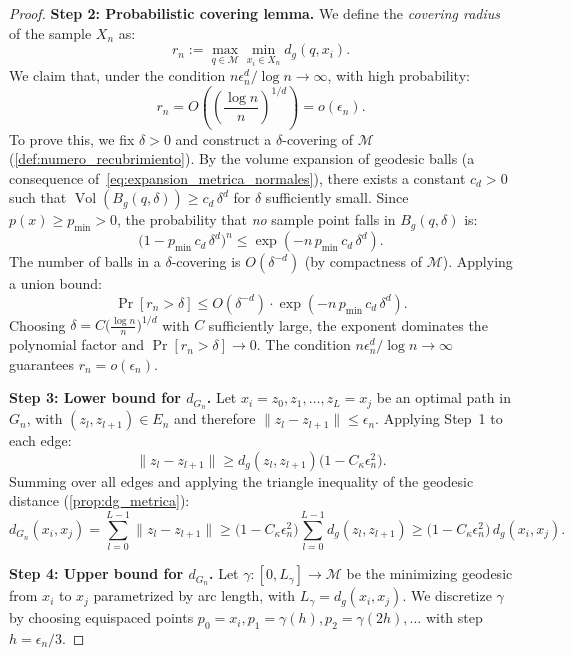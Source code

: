 \begin{proof}
	\textbf{Step 2: Probabilistic covering lemma.}
	We define the \emph{covering radius} of the sample $X_n$ as:
	\[
	r_n := \max_{q \in \mathcal{M}} \min_{x_i \in X_n} d_g(q, x_i).
	\]
	We claim that, under the condition $n\epsilon_n^d / \log n \to \infty$, with high probability:
	\begin{equation}\label{eq:radio_recubrimiento}
	r_n = O\!\left(\left(\frac{\log n}{n}\right)^{1/d}\right) = o(\epsilon_n).
	\end{equation}
	To prove this, we fix $\delta > 0$ and construct a $\delta$-covering of $\mathcal{M}$ (\autoref{def:numero_recubrimiento}). By the volume expansion of geodesic balls (a consequence of~\eqref{eq:expansion_metrica_normales}), there exists a constant $c_d > 0$ such that $\operatorname{Vol}(B_g(q, \delta)) \geq c_d \, \delta^d$ for $\delta$ sufficiently small. Since $p(x) \geq p_{\min} > 0$, the probability that \emph{no} sample point falls in $B_g(q, \delta)$ is:
	\[
	\bigl(1 - p_{\min} \, c_d \, \delta^d\bigr)^n \leq \exp(-n \, p_{\min} \, c_d \, \delta^d).
	\]
	The number of balls in a $\delta$-covering is $O(\delta^{-d})$ (by compactness of $\mathcal{M}$). Applying a union bound:
	\[
	\Pr[r_n > \delta] \leq O(\delta^{-d}) \cdot \exp(-n \, p_{\min} \, c_d \, \delta^d).
	\]
	Choosing $\delta = C\bigl(\frac{\log n}{n}\bigr)^{1/d}$ with $C$ sufficiently large, the exponent dominates the polynomial factor and $\Pr[r_n > \delta] \to 0$. The condition $n\epsilon_n^d/\log n \to \infty$ guarantees $r_n = o(\epsilon_n)$.

	\textbf{Step 3: Lower bound for $d_{G_n}$.}
	Let $x_i = z_0, z_1, \ldots, z_L = x_j$ be an optimal path in $G_n$, with $(z_l, z_{l+1}) \in E_n$ and therefore $\|z_l - z_{l+1}\| \leq \epsilon_n$. Applying Step~1 to each edge:
	\[
	\|z_l - z_{l+1}\| \geq d_g(z_l, z_{l+1})\bigl(1 - C_\kappa \epsilon_n^2\bigr).
	\]
	Summing over all edges and applying the triangle inequality of the geodesic distance (\autoref{prop:dg_metrica}):
	\begin{equation}\label{eq:cota_inferior_dGn}
	d_{G_n}(x_i, x_j) = \sum_{l=0}^{L-1} \|z_l - z_{l+1}\| \geq \bigl(1 - C_\kappa \epsilon_n^2\bigr) \sum_{l=0}^{L-1} d_g(z_l, z_{l+1}) \geq \bigl(1 - C_\kappa \epsilon_n^2\bigr) \, d_g(x_i, x_j).
	\end{equation}

	\textbf{Step 4: Upper bound for $d_{G_n}$.}
	Let $\gamma: [0, L_\gamma] \to \mathcal{M}$ be the minimizing geodesic from $x_i$ to $x_j$ parametrized by arc length, with $L_\gamma = d_g(x_i, x_j)$. We discretize $\gamma$ by choosing equispaced points $p_0 = x_i, p_1 = \gamma(h), p_2 = \gamma(2h), \ldots$ with step $h = \epsilon_n/3$.


\end{proof}
